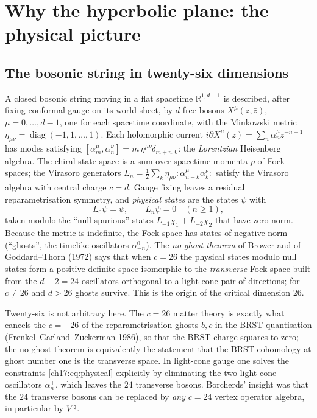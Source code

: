 \section{Why the hyperbolic plane: the physical picture}\label{ch17:sec:physics}

\subsection{The bosonic string in twenty-six dimensions}

A closed bosonic string moving in a flat spacetime $\mathbb R^{1,d-1}$ is described, after fixing
conformal gauge on its world-sheet, by $d$ free bosons $X^\mu(z,\bar z)$, $\mu=0,\dots,d-1$, one for each
spacetime coordinate, with the Minkowski metric $\eta_{\mu\nu}=\operatorname{diag}(-1,1,\dots,1)$.  Each
holomorphic current $i\partial X^\mu(z)=\sum_n\alpha^\mu_nz^{-n-1}$ has modes satisfying
$[\alpha^\mu_m,\alpha^\nu_n]=m\,\eta^{\mu\nu}\delta_{m+n,0}$: the \emph{Lorentzian} Heisenberg algebra.  The
chiral state space is a sum over spacetime momenta $p$ of Fock spaces; the Virasoro generators
$L_n=\frac12\sum_k\eta_{\mu\nu}{:}\alpha^\mu_{n-k}\alpha^\nu_k{:}$ satisfy the Virasoro algebra with central
charge $c=d$.  Gauge fixing leaves a residual reparametrisation symmetry, and \emph{physical states} are
the states $\psi$ with
\begin{equation}\label{ch17:eq:physical}
  L_0\psi=\psi,\qquad L_n\psi=0\quad(n\ge1),
\end{equation}
taken modulo the ``null spurious'' states $L_{-1}\chi_1+L_{-2}\chi_2$ that have zero norm.  Because the
metric is indefinite, the Fock space has states of negative norm (``ghosts'', the timelike oscillators
$\alpha^0_{-n}$).  The \emph{no-ghost theorem} of Brower and of Goddard--Thorn (1972) says that when
$c=26$ the physical states modulo null states form a positive-definite space isomorphic to the
\emph{transverse} Fock space built from the $d-2=24$ oscillators orthogonal to a light-cone pair of
directions; for $c\ne26$ and $d>26$ ghosts survive.  This is the origin of the critical dimension $26$.

\begin{physics}
Twenty-six is not arbitrary here.  The $c=26$ matter theory is exactly what cancels the $c=-26$ of the
reparametrisation ghosts $b,c$ in the BRST quantisation (Frenkel--Garland--Zuckerman 1986), so that the
BRST charge squares to zero; the no-ghost theorem is equivalently the statement that the BRST cohomology
at ghost number one is the transverse space.  In light-cone gauge one solves the constraints
\eqref{ch17:eq:physical} explicitly by eliminating the two light-cone oscillators $\alpha^\pm_n$, which
leaves the $24$ transverse bosons.  Borcherds' insight was that the $24$ transverse bosons can be replaced
by \emph{any} $c=24$ vertex operator algebra, in particular by ${V^{\natural}}$.
\end{physics}

